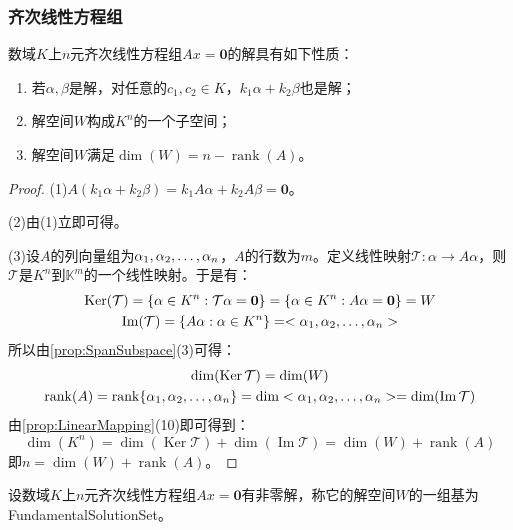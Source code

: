 \subsubsection{齐次线性方程组}
\begin{property}\label{prop:HomogeneousSLESolution}
	数域$K$上$n$元齐次线性方程组$Ax=\mathbf{0}$的解具有如下性质：
	\begin{enumerate}
		\item 若$\alpha,\beta$是解，对任意的$c_1,c_2\in K$，$k_1\alpha+k_2\beta$也是解；
		\item 解空间$W$构成$K^n$的一个子空间；
		\item 解空间$W$满足$\dim(W)=n-\operatorname{rank}(A)$。
	\end{enumerate}
\end{property}
\begin{proof}
	(1)$A(k_1\alpha+k_2\beta)=k_1A\alpha+k_2A\beta=\mathbf{0}$。\par
	(2)由(1)立即可得。\par
	(3)设$A$的列向量组为$\alpha_1, \alpha_2, \dots, \alpha_{n}$，$A$的行数为$m$。定义线性映射$\mathcal{T}:\alpha\longrightarrow A\alpha$，则$\mathcal{T}$是$K^n$到$\mathbb{K}^{m}$的一个线性映射。于是有：
	\begin{gather*}
		\operatorname{Ker}(\mathcal{T})=\{\alpha\in K^n:\mathcal{T}\alpha=\mathbf{0}\}=\{\alpha\in K^n:A\alpha=\mathbf{0}\}=W \\
		\operatorname{Im}(\mathcal{T})=\{A\alpha:\alpha\in K^n\}=<\alpha_1, \alpha_2, \dots, \alpha_{n}>
	\end{gather*}
	所以由\cref{prop:SpanSubspace}(3)可得：
	\begin{gather*}
		\dim(\operatorname{Ker}\mathcal{T})=\dim(W) \\
		\operatorname{rank}(A)=\operatorname{rank}\{\alpha_1, \alpha_2, \dots, \alpha_{n}\}=\dim<\alpha_1, \alpha_2, \dots, \alpha_{n}>=\dim(\operatorname{Im}\mathcal{T})
	\end{gather*}
	由\cref{prop:LinearMapping}(10)即可得到：
	\begin{equation*}
		\dim(K^n)=\dim(\operatorname{Ker}\mathcal{T})+\dim(\operatorname{Im}\mathcal{T})=\dim(W)+\operatorname{rank}(A)
	\end{equation*}
	即$n=\dim(W)+\operatorname{rank}(A)$。
\end{proof}
\begin{definition}
	设数域$K$上$n$元齐次线性方程组$Ax=\mathbf{0}$有非零解，称它的解空间$W$的一组基为\gls{FundamentalSolutionSet}。
\end{definition}

